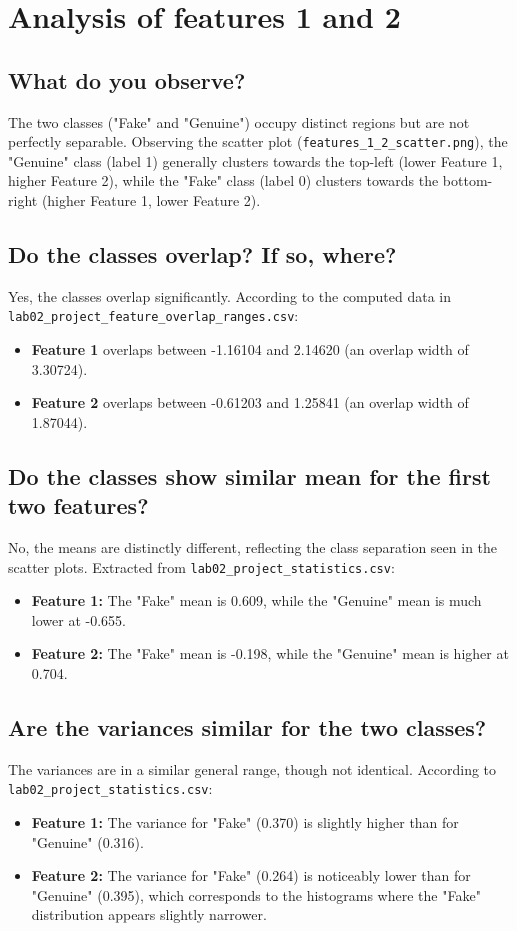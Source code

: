 \section*{Analysis of features 1 and 2}

\subsection*{What do you observe?}
The two classes ("Fake" and "Genuine") occupy distinct regions but are not perfectly separable. Observing the scatter plot (\texttt{features\_1\_2\_scatter.png}), the "Genuine" class (label 1) generally clusters towards the top-left (lower Feature 1, higher Feature 2), while the "Fake" class (label 0) clusters towards the bottom-right (higher Feature 1, lower Feature 2).

\subsection*{Do the classes overlap? If so, where?}
Yes, the classes overlap significantly. According to the computed data in \texttt{lab02\_project\_feature\_overlap\_ranges.csv}:
\begin{itemize}
    \item \textbf{Feature 1} overlaps between -1.16104 and 2.14620 (an overlap width of 3.30724).
    \item \textbf{Feature 2} overlaps between -0.61203 and 1.25841 (an overlap width of 1.87044).
\end{itemize}

\subsection*{Do the classes show similar mean for the first two features?}
No, the means are distinctly different, reflecting the class separation seen in the scatter plots. Extracted from \texttt{lab02\_project\_statistics.csv}:
\begin{itemize}
    \item \textbf{Feature 1:} The "Fake" mean is 0.609, while the "Genuine" mean is much lower at -0.655.
    \item \textbf{Feature 2:} The "Fake" mean is -0.198, while the "Genuine" mean is higher at 0.704.
\end{itemize}

\subsection*{Are the variances similar for the two classes?}
The variances are in a similar general range, though not identical. According to \texttt{lab02\_project\_statistics.csv}:
\begin{itemize}
    \item \textbf{Feature 1:} The variance for "Fake" (0.370) is slightly higher than for "Genuine" (0.316).
    \item \textbf{Feature 2:} The variance for "Fake" (0.264) is noticeably lower than for "Genuine" (0.395), which corresponds to the histograms where the "Fake" distribution appears slightly narrower.
\end{itemize}

